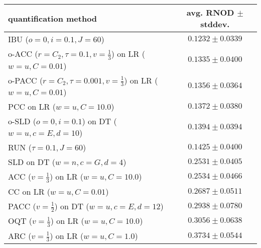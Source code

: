 \begin{tabular}{lc}
  \toprule
  quantification method & avg. RNOD $\pm$ stddev. \\
  \midrule
  IBU ($o=0, i=0.1, J=60$) & $\mathbf{0.1232 \pm 0.0339}$ \\
  o-ACC ($r=C_2, \tau=0.1, v=\frac{1}{3}$) on LR ($w=u, C=0.01$) & $0.1335 \pm 0.0400$ \\
  o-PACC ($r=C_2, \tau=0.001, v=\frac{1}{3}$) on LR ($w=u, C=0.01$) & $0.1356 \pm 0.0364$ \\
  PCC on LR ($w=u, C=10.0$) & $0.1372 \pm 0.0380$ \\
  o-SLD ($o=0, i=0.1$) on DT ($w=u, c=E, d=10$) & $0.1394 \pm 0.0394$ \\
  RUN ($\tau=0.1, J=60$) & $0.1425 \pm 0.0400$ \\
  SLD on DT ($w=n, c=G, d=4$) & $0.2531 \pm 0.0405$ \\
  ACC ($v=\frac{1}{3}$) on LR ($w=u, C=10.0$) & $0.2534 \pm 0.0466$ \\
  CC on LR ($w=u, C=0.01$) & $0.2687 \pm 0.0511$ \\
  PACC ($v=\frac{1}{2}$) on DT ($w=u, c=E, d=12$) & $0.2938 \pm 0.0780$ \\
  OQT ($v=\frac{1}{3}$) on LR ($w=u, C=10.0$) & $0.3056 \pm 0.0638$ \\
  ARC ($v=\frac{1}{3}$) on LR ($w=u, C=1.0$) & $0.3734 \pm 0.0544$ \\
  \bottomrule
\end{tabular}
